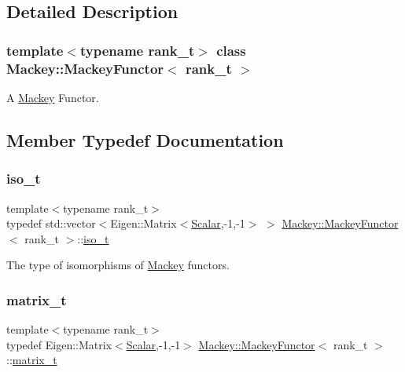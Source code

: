 \subsection{Detailed Description}
\subsubsection*{template$<$typename rank\+\_\+t$>$\newline
class Mackey\+::\+Mackey\+Functor$<$ rank\+\_\+t $>$}

A \hyperlink{namespaceMackey}{Mackey} Functor. 

\subsection{Member Typedef Documentation}
\mbox{\label{classMackey_1_1MackeyFunctor_a53637e79f2502411ba085d2b2a61bb67}} 
\subsubsection{\texorpdfstring{iso\+\_\+t}{iso\_t}}
{\footnotesize\ttfamily template$<$typename rank\+\_\+t$>$ \\
typedef std\+::vector$<$Eigen\+::\+Matrix$<$\hyperlink{classMackey_1_1MackeyFunctor_a124b4175216c4cf9a4b67acc78e9246d}{Scalar},-\/1,-\/1$>$ $>$ \hyperlink{classMackey_1_1MackeyFunctor}{Mackey\+::\+Mackey\+Functor}$<$ rank\+\_\+t $>$\+::\hyperlink{classMackey_1_1MackeyFunctor_a53637e79f2502411ba085d2b2a61bb67}{iso\+\_\+t}}



The type of isomorphisms of \hyperlink{namespaceMackey}{Mackey} functors. 

\mbox{\label{classMackey_1_1MackeyFunctor_a271550bc911da5c842bbc90d8bf87973}} 
\subsubsection{\texorpdfstring{matrix\+\_\+t}{matrix\_t}}
{\footnotesize\ttfamily template$<$typename rank\+\_\+t$>$ \\
typedef Eigen\+::\+Matrix$<$\hyperlink{classMackey_1_1MackeyFunctor_a124b4175216c4cf9a4b67acc78e9246d}{Scalar},-\/1,-\/1$>$ \hyperlink{classMackey_1_1MackeyFunctor}{Mackey\+::\+Mackey\+Functor}$<$ rank\+\_\+t $>$\+::\hyperlink{classMackey_1_1MackeyFunctor_a271550bc911da5c842bbc90d8bf87973}{matrix\+\_\+t}}



